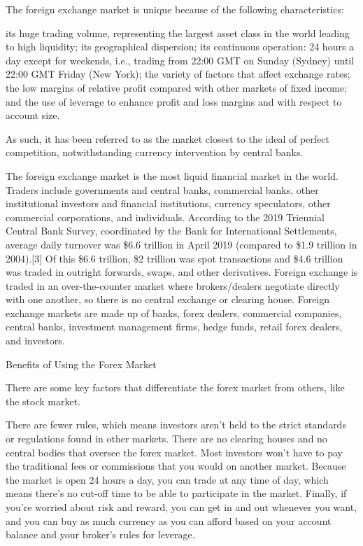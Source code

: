The foreign exchange market is unique because of the following characteristics:

    its huge trading volume, representing the largest asset class in the world leading to high liquidity;
    its geographical dispersion;
    its continuous operation: 24 hours a day except for weekends, i.e., trading from 22:00 GMT on Sunday (Sydney) until 22:00 GMT Friday (New York);
    the variety of factors that affect exchange rates;
    the low margins of relative profit compared with other markets of fixed income; and
    the use of leverage to enhance profit and loss margins and with respect to account size.

As such, it has been referred to as the market closest to the ideal of perfect competition, notwithstanding currency intervention by central banks.

The foreign exchange market is the most liquid financial market in the world. Traders include governments and central banks, commercial banks, other institutional investors and financial institutions, currency speculators, other commercial corporations, and individuals. According to the 2019 Triennial Central Bank Survey, coordinated by the Bank for International Settlements, average daily turnover was \$6.6 trillion in April 2019 (compared to \$1.9 trillion in 2004).[3] Of this \$6.6 trillion, \$2 trillion was spot transactions and \$4.6 trillion was traded in outright forwards, swaps, and other derivatives.
Foreign exchange is traded in an over-the-counter market where brokers/dealers negotiate directly with one another, so there is no central exchange or clearing house.
Foreign exchange markets are made up of banks, forex dealers, commercial companies, central banks, investment management firms, hedge funds, retail forex dealers, and investors.

Benefits of Using the Forex Market

There are some key factors that differentiate the forex market from others, like the stock market.

    There are fewer rules, which means investors aren't held to the strict standards or regulations found in other markets.
    There are no clearing houses and no central bodies that oversee the forex market.
    Most investors won't have to pay the traditional fees or commissions that you would on another market.
    Because the market is open 24 hours a day, you can trade at any time of day, which means there's no cut-off time to be able to participate in the market.
    Finally, if you're worried about risk and reward, you can get in and out whenever you want, and you can buy as much currency as you can afford based on your account balance and your broker's rules for leverage.

